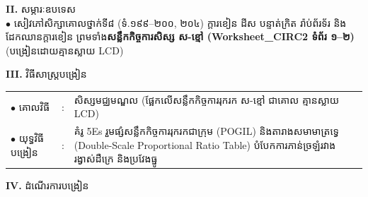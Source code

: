 \documentclass[a4paper,10pt]{article}
\newcommand{\en}[1]{{\TimesEn #1}}
\begin{document}
{%
\textbf{II.} {\muol សម្ភារៈឧបទេស}\\[1pt]
\hspace*{0.55cm}$\bullet$ \hspace{0.35cm} សៀវភៅសិក្សាគោលថ្នាក់ទី៨ (ទំ.១៩៩--២០០, ២០៤) ក្ដារខៀន ដីស បន្ទាត់ក្រិត រ៉ាប់ព័រទ័រ និងដែកឈានក្ដារខៀន ព្រមទាំង\textbf{សន្លឹកកិច្ចការសិស្ស ស-ខ្មៅ (\en{Worksheet\_CIRC2} ទំព័រ ១--២)} (បង្រៀនដោយគ្មានស្លាយ \en{LCD})

\vspace{1pt}

\textbf{III.} {\muol វិធីសាស្រ្តបង្រៀន}\\[1pt]
\hspace*{0.45cm}%
\begin{tabular}{@{}l l L{14.85cm}@{}}
  $\bullet$ \hspace{0.25cm} គោលវិធី & : & សិស្សមជ្ឈមណ្ឌល (ផ្អែកលើសន្លឹកកិច្ចការរុករក ស-ខ្មៅ ជាគោល គ្មានស្លាយ \en{LCD}) \\
  $\bullet$ \hspace{0.25cm} យុទ្ធវិធីបង្រៀន & : & គំរូ 5Es រួមផ្សំសន្លឹកកិច្ចការរុករកជាក្រុម (\en{POGIL}) និងតារាងសមាមាត្រទ្វេ (\en{Double-Scale Proportional Ratio Table}) បំបែកការភាន់ច្រឡំរវាងរង្វាស់ដឺក្រេ និងប្រវែងធ្នូ \\
\end{tabular}
}

\vspace{1pt}

\textbf{IV.} {\muol ដំណើរការបង្រៀន}

\vspace{1pt}
\end{document}
